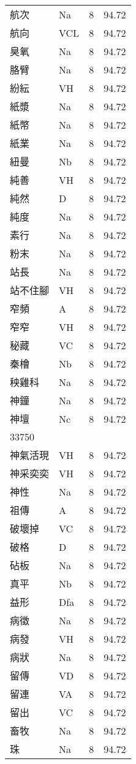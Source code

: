 \documentclass[twocolumn]{book}
\begin{document}
\begin{supertabular}{llrr}
航次 & Na & 8 &  94.72\\
航向 & VCL & 8 &  94.72\\
臭氧 & Na & 8 &  94.72\\
胳臂 & Na & 8 &  94.72\\
紛紜 & VH & 8 &  94.72\\
紙漿 & Na & 8 &  94.72\\
紙幣 & Na & 8 &  94.72\\
紙業 & Na & 8 &  94.72\\
紐曼 & Nb & 8 &  94.72\\
純善 & VH & 8 &  94.72\\
純然 & D & 8 &  94.72\\
純度 & Na & 8 &  94.72\\
素行 & Na & 8 &  94.72\\
粉末 & Na & 8 &  94.72\\
站長 & Na & 8 &  94.72\\
站不住腳 & VH & 8 &  94.72\\
窄頻 & A & 8 &  94.72\\
窄窄 & VH & 8 &  94.72\\
秘藏 & VC & 8 &  94.72\\
秦檜 & Nb & 8 &  94.72\\
秧雞科 & Na & 8 &  94.72\\
神鐘 & Na & 8 &  94.72\\
神壇 & Nc & 8 &  94.72\\
33750\\
神氣活現 & VH & 8 &  94.72\\
神采奕奕 & VH & 8 &  94.72\\
神性 & Na & 8 &  94.72\\
祖傳 & A & 8 &  94.72\\
破壞掉 & VC & 8 &  94.72\\
破格 & D & 8 &  94.72\\
砧板 & Na & 8 &  94.72\\
真平 & Nb & 8 &  94.72\\
益形 & Dfa & 8 &  94.72\\
病徵 & Na & 8 &  94.72\\
病發 & VH & 8 &  94.72\\
病狀 & Na & 8 &  94.72\\
留傳 & VD & 8 &  94.72\\
留連 & VA & 8 &  94.72\\
留出 & VC & 8 &  94.72\\
畜牧 & Na & 8 &  94.72\\
珠 & Na & 8 &  94.72\\

\end{supertabular}
\end{document}
